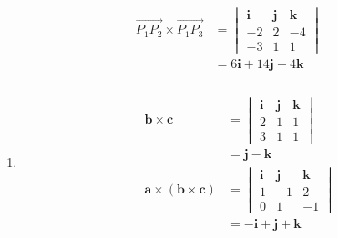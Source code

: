 \documentclass{article}
\begin{document}
\setcounter{subsubsection}{10}
\subsubsection{}

\begin{align*}
  \overrightarrow{P_1 P_2} \times \overrightarrow{P_1 P_3} & = \begin{vmatrix}
                                                                 \mathbf{i} & \mathbf{j} & \mathbf{k} \\
                                                                 -2         & 2          & -4         \\
                                                                 -3         & 1          & 1
                                                               \end{vmatrix}        \\
                                                           & = 6 \mathbf{i} + 14 \mathbf{j} + 4 \mathbf{k}
\end{align*}

\setcounter{subsubsection}{16}
\subsubsection{}

\begin{enumerate}
  \item

        \begin{align*}
          \mathbf{b} \times \mathbf{c}                     & = \begin{vmatrix}
                                                                 \mathbf{i} & \mathbf{j} & \mathbf{k} \\
                                                                 2          & 1          & 1          \\
                                                                 3          & 1          & 1
                                                               \end{vmatrix}  \\
                                                           & = \mathbf{j} - \mathbf{k}               \\
          \mathbf{a} \times (\mathbf{b} \times \mathbf{c}) & = \begin{vmatrix}
                                                                 \mathbf{i} & \mathbf{j} & \mathbf{k} \\
                                                                 1          & -1         & 2          \\
                                                                 0          & 1          & -1
                                                               \end{vmatrix}  \\
                                                           & = -\mathbf{i} + \mathbf{j} + \mathbf{k}
        \end{align*}
\end{enumerate}
\end{document}
